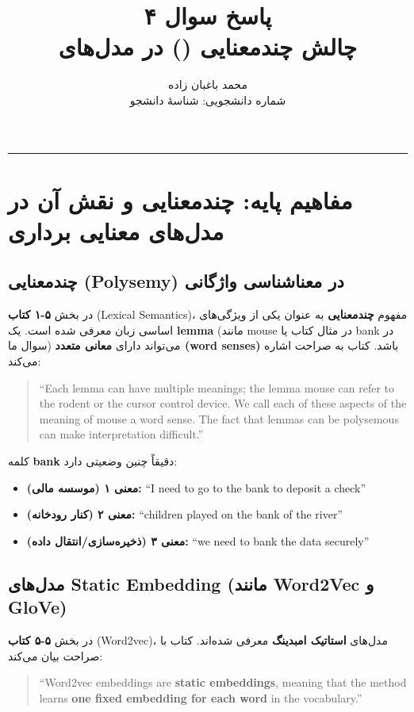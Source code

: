 \documentclass[11pt,a4paper]{article}
\title{\textbf{پاسخ سوال ۴} \\[0.4cm] \small چالش چندمعنایی (\en{Polysemy}) در مدل‌های \en{Static Embedding}}
\author{محمد باغبان زاده \\ شماره دانشجویی: شناسهٔ دانشجو}
\date{}
\newcommand{\en}[1]{\textenglish{#1}}
\newcommand{\thickseparator}{\vspace{1em}\noindent\rule{\linewidth}{1pt}\vspace{1em}}
\begin{document}
\maketitle
\thickseparator

\section{مفاهیم پایه: چندمعنایی و نقش آن در مدل‌های معنایی برداری}

\subsection{چندمعنایی (\en{Polysemy}) در معناشناسی واژگانی}
در بخش \textbf{\en{۵-۱} کتاب} (\en{Lexical Semantics})، مفهوم \textbf{چندمعنایی} به عنوان یکی از ویژگی‌های اساسی زبان معرفی شده است. یک \textbf{\en{lemma}} (مانند \en{mouse} در مثال کتاب یا \en{bank} در سوال ما) می‌تواند دارای \textbf{معانی متعدد (\en{word senses})} باشد. کتاب به صراحت اشاره می‌کند:

\begin{quote}
\en{``Each lemma can have multiple meanings; the lemma mouse can refer to the rodent or the cursor control device. We call each of these aspects of the meaning of mouse a word sense. The fact that lemmas can be polysemous can make interpretation difficult.''}
\end{quote}

کلمه \textbf{\en{bank}} دقیقاً چنین وضعیتی دارد:
\begin{itemize}
    \item \textbf{معنی ۱ (موسسه مالی):} \en{``I need to go to the bank to deposit a check''}
    \item \textbf{معنی ۲ (کنار رودخانه):} \en{``children played on the bank of the river''}
    \item \textbf{معنی ۳ (ذخیره‌سازی/انتقال داده):} \en{``we need to bank the data securely''}
\end{itemize}

\subsection{مدل‌های \en{Static Embedding} (مانند \en{Word2Vec} و \en{GloVe})}
در بخش \textbf{\en{۵-۵} کتاب} (\en{Word2vec})، مدل‌های \textbf{استاتیک امبدینگ} معرفی شده‌اند. کتاب با صراحت بیان می‌کند:

\begin{quote}
\en{``Word2vec embeddings are \textbf{static embeddings}, meaning that the method learns \textbf{one fixed embedding for each word} in the vocabulary.''}
\end{quote}
\end{document}
